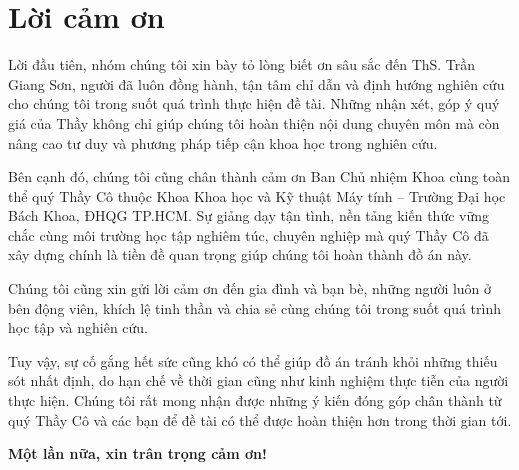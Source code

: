 \chapter*{Lời cảm ơn}
\thispagestyle{empty}

\setlength{\parindent}{2em}
\large

Lời đầu tiên, nhóm chúng tôi xin bày tỏ lòng biết ơn sâu sắc đến ThS. Trần Giang Sơn, người đã luôn đồng hành, tận tâm chỉ dẫn và định hướng nghiên cứu cho chúng tôi trong suốt quá trình thực hiện đề tài. Những nhận xét, góp ý quý giá của Thầy không chỉ giúp chúng tôi hoàn thiện nội dung chuyên môn mà còn nâng cao tư duy và phương pháp tiếp cận khoa học trong nghiên cứu.

\vspace{1.5em}

Bên cạnh đó, chúng tôi cũng chân thành cảm ơn Ban Chủ nhiệm Khoa cùng toàn thể quý Thầy Cô thuộc Khoa Khoa học và Kỹ thuật Máy tính – Trường Đại học Bách Khoa, ĐHQG TP.HCM. Sự giảng dạy tận tình, nền tảng kiến thức vững chắc cùng môi trường học tập nghiêm túc, chuyên nghiệp mà quý Thầy Cô đã xây dựng chính là tiền đề quan trọng giúp chúng tôi hoàn thành đồ án này.

\vspace{1.5em}

Chúng tôi cũng xin gửi lời cảm ơn đến gia đình và bạn bè, những người luôn ở bên động viên, khích lệ tinh thần và chia sẻ cùng chúng tôi trong suốt quá trình học tập và nghiên cứu.

\vspace{1.5em}

Tuy vậy, sự cố gắng hết sức cũng khó có thể giúp đồ án tránh khỏi những thiếu sót nhất định, do hạn chế về thời gian cũng như kinh nghiệm thực tiễn của người thực hiện. Chúng tôi rất mong nhận được những ý kiến đóng góp chân thành từ quý Thầy Cô và các bạn để đề tài có thể được hoàn thiện hơn trong thời gian tới.

\vspace{1.5em}

\textbf{Một lần nữa, xin trân trọng cảm ơn!
}
\clearpage
{}
